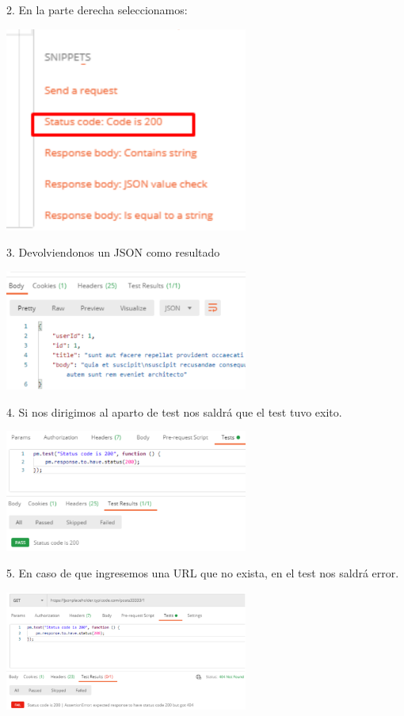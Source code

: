 \documentclass[twoside,twocolumn]{article}
\begin{document}
2. En la parte derecha seleccionamos:

\includegraphics[width=8cm]{Imagenes/2}

3. Devolviendonos un JSON como resultado

\includegraphics[width=8cm]{Imagenes/3}

4. Si nos dirigimos al aparto de test nos saldrá que el test tuvo exito.

\includegraphics[width=8cm]{Imagenes/4}

5. En caso de que ingresemos una URL que no exista, en el test nos saldrá error.

\includegraphics[width=8cm]{Imagenes/5}
\end{document}
